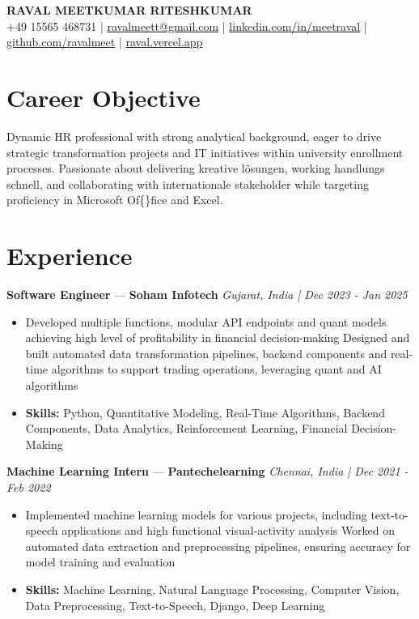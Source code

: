 \documentclass[a4paper,10pt]{article}
\begin{document}
\begin{center}
  {\Large\bfseries RAVAL MEETKUMAR RITESHKUMAR}\\[2pt]
  {\small +49 15565 468731 \;|\; \href{mailto:ravalmeett@gmail.com}{ravalmeett@gmail.com} \;|\; \href{https://www.linkedin.com/in/meetraval/}{linkedin.com/in/meetraval} \;|\; \href{https://github.com/ravalmeet}{github.com/ravalmeet} \;|\; \href{https://raval.vercel.app/}{raval.vercel.app}}
\end{center}
\vspace{-3pt}

\section*{Career Objective}
Dynamic HR professional with strong analytical background, eager to drive strategic transformation projects and IT initiatives within university enrollment processes. Passionate about delivering kreative lösungen, working handlungs schnell, and collaborating with internationale stakeholder while targeting proficiency in Microsoft Of\{\}fice and Excel.\par

\section*{Experience}
\textbf{Software Engineer} — \textbf{Soham Infotech} \hfill \textit{Gujarat, India \;|\; Dec 2023 - Jan 2025}\par
\vspace{1pt}
\begin{itemize}
  \item Developed multiple functions, modular API endpoints and quant models achieving high level of profitability in financial decision-making Designed and built automated data transformation pipelines, backend components and real-time algorithms to support trading operations, leveraging quant and AI algorithms
  \item \textbf{Skills:} Python, Quantitative Modeling, Real-Time Algorithms, Backend Components, Data Analytics, Reinforcement Learning, Financial Decision-Making
\end{itemize}
\vspace{3pt}
\textbf{Machine Learning Intern} — \textbf{Pantechelearning} \hfill \textit{Chennai, India \;|\; Dec 2021 - Feb 2022}\par
\vspace{1pt}
\begin{itemize}
  \item Implemented machine learning models for various projects, including text-to-speech applications and high functional visual-activity analysis Worked on automated data extraction and preprocessing pipelines, ensuring accuracy for model training and evaluation
  \item \textbf{Skills:} Machine Learning, Natural Language Processing, Computer Vision, Data Preprocessing, Text-to-Speech, Django, Deep Learning
\end{itemize}
\end{document}
